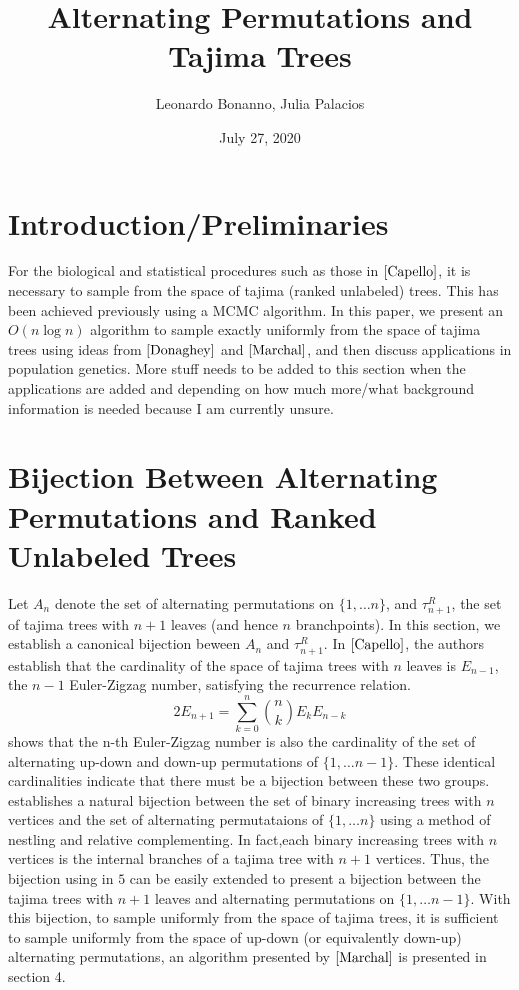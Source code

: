 \documentclass[11pt]{article}
\title{Alternating Permutations and Tajima Trees}
\author{Leonardo Bonanno, Julia Palacios}
\date{July 27, 2020}
\begin{document}
\maketitle

\section{Introduction/Preliminaries}
For the biological and statistical procedures such as those in $\cite{Capello}$, it is necessary to sample from the space of tajima (ranked unlabeled) trees. This has been achieved previously using a MCMC algorithm. In this paper, we present an $O\left(n\log n\right)$ algorithm to sample exactly uniformly from the space of tajima trees using ideas from $\cite{Donaghey}$ and $\cite{Marchal}$, and then discuss applications in population genetics. More stuff needs to be added to this section when the applications are added and depending on how much more/what background information is needed because I am currently unsure. 

\section{Bijection Between Alternating Permutations and Ranked Unlabeled Trees}
Let $A_n$ denote the set of alternating permutations on $\{1, \ldots n\}$, and $\tau_{n + 1}^{R}$, the set of tajima trees with $n + 1$ leaves (and hence $n$ branchpoints). In this section, we establish a canonical bijection beween $A_n$ and $\tau_{n + 1}^{R}$. 
In $\cite{Capello}$, the authors establish that the cardinality of the space of tajima trees with $n$ leaves is $E_{n-1}$, the $n-1$ Euler-Zigzag number, satisfying the recurrence relation.
\begin{equation}
2E_{n+1} = \sum_{k = 0}^{n} {n \choose k} E_{k} E_{n-k}
\end{equation} 
\cite{Stanley} shows that the n-th Euler-Zigzag number is also the cardinality of the set of alternating up-down and down-up permutations of $\{1, \ldots n-1\}$. These identical cardinalities indicate that there must be a bijection between these two groups. \cite{Donaghey} establishes a natural bijection between the set of binary increasing trees with $n$ vertices and the set of alternating permutataions of $\{1, \ldots n\}$ using a method of nestling and relative complementing. In fact,each  binary increasing trees with $n$ vertices is the internal branches of a tajima tree with $n + 1$ vertices. Thus, the bijection using in $\text{5}$ can be easily extended to present a bijection between the tajima trees with $n + 1$ leaves and alternating permutations on $\{1, \ldots n-1\}$. With this bijection, to sample uniformly from the space of tajima trees, it is sufficient to sample uniformly from the space of up-down (or equivalently down-up) alternating permutations, an algorithm presented by $\cite{Marchal}$ is presented in section 4.
\end{document}
